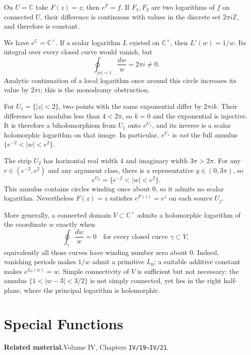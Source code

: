 \begin{solution}
On $U=\mathbb C$ take $F(z)=z$; then $e^F=f$.
If $F_1,F_2$ are two logarithms of $f$ on connected $U$, their
difference is continuous with values in the discrete set
$2\pi i\mathbb Z$, and therefore is constant.

We have $e^{\mathbb C}=\mathbb C^\times$.
If a scalar logarithm $L$ existed on $\mathbb C^\times$, then
$L'(w)=1/w$. Its integral over every closed curve would vanish,
but
\[
\oint_{|w|=1}\frac{dw}{w}=2\pi i\ne0.
\]
Analytic continuation of a local logarithm once around this circle
increases its value by $2\pi i$; this is the monodromy obstruction.

For $U_1=\{|z|<2\}$, two points with the same exponential differ
by $2\pi i k$. Their difference has modulus less than $4<2\pi$,
so $k=0$ and the exponential is injective. It is therefore a
biholomorphism from $U_1$ onto $e^{U_1}$, and its inverse is a
scalar holomorphic logarithm on that image. In particular,
$e^{U_1}$ is \emph{not} the full annulus
$\{e^{-2}<|w|<e^2\}$.

The strip $U_2$ has horizontal real width $4$ and imaginary width
$3\pi>2\pi$. For any $r\in(e^{-2},e^2)$ and any argument class,
there is a representative $y\in(0,3\pi)$, so
\[
e^{U_2}=\{e^{-2}<|w|<e^2\}.
\]
This annulus contains circles winding once about $0$, so it admits
no scalar logarithm. Nevertheless $F(z)=z$ satisfies
$e^{F(z)}=e^z$ on each source $U_j$.

More generally, a connected domain $V\subset\mathbb C^\times$
admits a holomorphic logarithm of the coordinate $w$ exactly when
\[
\oint_\gamma\frac{dw}{w}=0
\quad\text{for every closed curve }\gamma\subset V,
\]
equivalently all those curves have winding number zero about $0$.
Indeed, vanishing periods makes $1/w$ admit a primitive $L_0$;
a suitable additive constant makes $e^{L_0(w)}=w$.
Simple connectivity of $V$ is sufficient but not necessary: the
annulus $\{1<|w-3|<3/2\}$ is not simply connected, yet lies in the
right half-plane, where the principal logarithm is holomorphic.
\end{solution}


\section{Special Functions}

\par\medskip\noindent\textbf{Related material.}\quad Volume IV, Chapters \texttt{IV/19--IV/21}.


